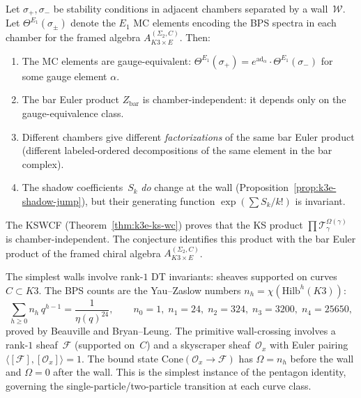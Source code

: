 \begin{conjecture}
\label{conj:k3e-bar-euler-invariance}
Let $\sigma_+, \sigma_-$ be stability conditions in adjacent chambers separated by a wall~$\mathcal{W}$. Let $\Theta^{E_1}(\sigma_\pm)$ denote the $E_1$ MC elements encoding the BPS spectra in each chamber for the framed algebra $A_{K3 \times E}^{(\Sigma_2,C)}$. Then:
\begin{enumerate}[label=(\roman*)]
 \item The MC elements are gauge-equivalent: $\Theta^{E_1}(\sigma_+) = e^{\mathrm{ad}_\alpha} \cdot \Theta^{E_1}(\sigma_-)$ for some gauge element $\alpha$.
 \item The bar Euler product $Z_{\mathrm{bar}}$ is chamber-independent: it depends only on the gauge-equivalence class.
 \item Different chambers give different \emph{factorizations} of the same bar Euler product (different labeled-ordered decompositions of the same element in the bar complex).
 \item The shadow coefficients~$S_k$ \emph{do} change at the wall (Proposition~\ref{prop:k3e-shadow-jump}), but their generating function $\exp(\sum S_k / k!)$ is invariant.
\end{enumerate}
The KSWCF (Theorem~\ref{thm:k3e-ks-wc}) proves that the KS product $\prod \mathcal{T}_\gamma^{\Omega(\gamma)}$ is chamber-independent. The conjecture identifies this product with the bar Euler product of the framed chiral algebra $A_{K3 \times E}^{(\Sigma_2,C)}$.
\end{conjecture}

\begin{remark}
\label{rem:k3e-primitive-wc}
The simplest walls involve rank-$1$ DT invariants: sheaves supported on curves~$C \subset K3$. The BPS counts are the Yau--Zaslow numbers $n_h = \chi(\mathrm{Hilb}^h(K3))$:
\[
 \sum_{h \geq 0} n_h \, q^{h-1} = \frac{1}{\eta(q)^{24}}, \qquad n_0 = 1, \; n_1 = 24, \; n_2 = 324, \; n_3 = 3200, \; n_4 = 25650,
\]
proved by Beauville and Bryan--Leung. The primitive wall-crossing involves a rank-$1$ sheaf~$\mathcal{F}$ (supported on~$C$) and a skyscraper sheaf~$\mathcal{O}_x$ with Euler pairing $\langle [\mathcal{F}], [\mathcal{O}_x] \rangle = 1$. The bound state $\mathrm{Cone}(\mathcal{O}_x \to \mathcal{F})$ has $\Omega = n_h$ before the wall and $\Omega = 0$ after the wall. This is the simplest instance of the pentagon identity, governing the single-particle/two-particle transition at each curve class.
\end{remark}

